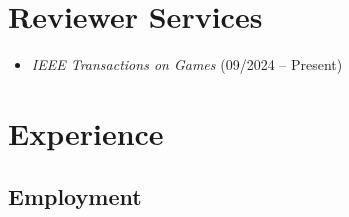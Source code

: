 \documentclass{article}
\begin{document}
	\section*{Reviewer Services}

	\begin{itemize}
		\item \textit{IEEE Transactions on Games} (09/2024 -- Present) \\
	\end{itemize}

	\section*{Experience}

	\subsection*{Employment}
\end{document}
